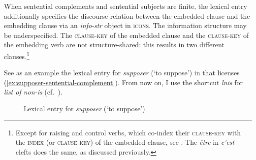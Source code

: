 \eal 
{}
\zl 

When sentential complements and sentential subjects are finite, the lexical entry additionally specifies the discourse relation between the embedded clause and the embedding clause via an \emph{info-str} object in \textsc{icons}. The information structure may be underspecified.
The \textsc{clause-key} of the embedded clause and the \textsc{clause-key} of the embedding verb are not structure-shared: this results in two different clauses.\footnote{Except for raising and control verbs, which co-index their \textsc{clause-key} with the \textsc{index} (or \textsc{clause-key}) of the embedded clause, see \citet[141]{Song.2017}. The \emph{être} in \emph{c'est}-clefts does the same, as discussed previously.} 

See as an example the lexical entry for \emph{supposer} (`to suppose') in  that licenses (\ref{ex:supposer-sentential-complement}). From now on, I use the shortcut \emph{lnis} for \emph{list of non-is} (cf.\ ).

\begin{figure}

\caption{Lexical entry for \emph{supposer} (`to suppose')}
\label{ex:avm-supposer}
\end{figure}

